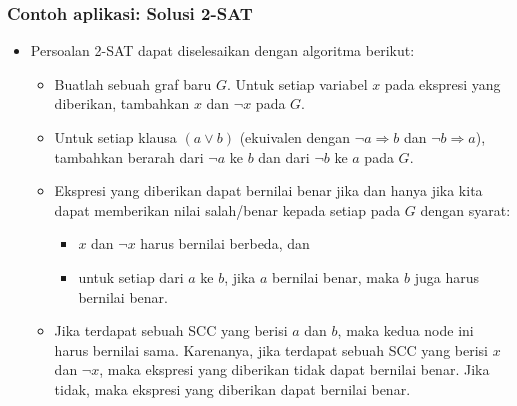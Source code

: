 \begin{frame}
\frametitle{Contoh aplikasi: Solusi 2-SAT}
\begin{itemize}
  \item Persoalan 2-SAT dapat diselesaikan dengan algoritma berikut:
  \begin{itemize}
    \item Buatlah sebuah graf baru $G$. Untuk setiap variabel $x$ pada ekspresi yang diberikan, tambahkan \fnode $x$ dan $\neg x$ pada $G$.
    \item Untuk setiap klausa $(a \lor b)$ (ekuivalen dengan $\neg a \Rightarrow b$ dan $\neg b \Rightarrow a$), tambahkan \fedge berarah dari \fnode $\neg a$ ke \fnode $b$ dan dari \fnode $\neg b$ ke \fnode $a$ pada $G$.
    \item Ekspresi yang diberikan dapat bernilai benar jika dan hanya jika kita dapat memberikan nilai salah/benar kepada setiap \fnode pada $G$ dengan syarat:
    \begin{itemize}
      \item \fnode $x$ dan \fnode $\neg x$ harus bernilai berbeda, dan
      \item untuk setiap \fedge dari \fnode $a$ ke \fnode $b$, jika \fnode $a$ bernilai benar, maka \fnode $b$ juga harus bernilai benar.
    \end{itemize}
    \item Jika terdapat sebuah SCC yang berisi \fnode $a$ dan \fnode $b$, maka kedua node ini harus bernilai sama. Karenanya, jika terdapat sebuah SCC yang berisi \fnode $x$ dan \fnode $\neg x$, maka ekspresi yang diberikan tidak dapat bernilai benar. Jika tidak, maka ekspresi yang diberikan dapat bernilai benar.
  \end{itemize}
\end{itemize}
\end{frame}


